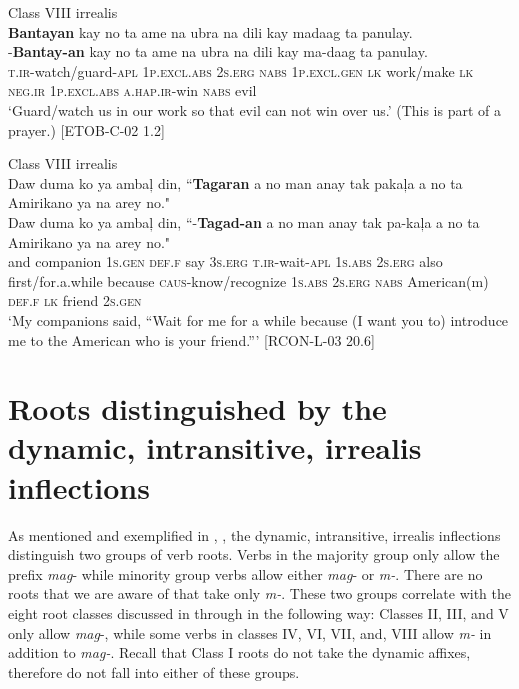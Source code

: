 \newpage
\ea
Class VIII irrealis \\
\textbf{Bantayan}  kay  no  ta  ame  na  ubra na  dili  kay  madaag  ta  panulay. \\\smallskip
\gll \emptyset{}-\textbf{Bantay-an}  kay  no  ta  ame  na  ubra na  dili  kay  ma-daag  ta  panulay. \\
\textsc{t.ir}-watch/guard-\textsc{apl}  1\textsc{p.excl.abs}  2\textsc{s.erg}  \textsc{nabs}  1\textsc{p.excl.gen}  \textsc{lk}  work/make
\textsc{lk}  \textsc{neg.ir}  1\textsc{p.excl.abs}  \textsc{a.hap.ir}-win  \textsc{nabs}  evil \\
\glt ‘Guard/watch us in our work so that evil can not win over us.’ (This is part of a prayer.) [ETOB-C-02 1.2]
\z

\ea
Class VIII irrealis \\
Daw  duma  ko  ya  ambaļ  din,  ``\textbf{Tagaran}  a  no  man anay  tak  pakaļa  a  no  ta Amirikano  ya  na  arey  no."   \\\smallskip
\gll Daw  duma  ko  ya  ambaļ  din,  ``\emptyset{}-\textbf{Tagad-an}  a  no  man anay  tak  pa-kaļa  a  no  ta Amirikano  ya  na  arey  no." \\
and  companion  1\textsc{s.gen}  \textsc{def.f}  say  3\textsc{s.erg}  \textsc{t.ir}-wait-\textsc{apl}  1\textsc{s.abs}  2\textsc{s.erg}  also
first/for.a.while  because  \textsc{caus}-know/recognize  1\textsc{s.abs}  2\textsc{s.erg}  \textsc{nabs}  American(m)  \textsc{def.f}  \textsc{lk}  friend  2\textsc{s.gen} \\
\glt ‘My companions said, “Wait for me for a while because (I want you to) introduce me to the American who is your friend.”' [RCON-L-03 20.6]
\z

\section{Roots distinguished by the dynamic, intransitive, irrealis inflections}
\label{sec:irrealisinflections}

As mentioned and exemplified in , , the dynamic, intransitive, irrealis inflections distinguish two groups of verb roots. Verbs in the majority group only allow the prefix \textit{mag}{}- while minority group verbs allow either \textit{mag}{}- or \textit{m-}.  There are no roots that we are aware of that take only \textit{m-}. These two groups correlate with the eight root classes discussed in  through  in the following way: Classes II, III, and V only allow \textit{mag}{}-, while some verbs in classes IV, VI, VII, and, VIII allow \textit{m-} in addition to \textit{mag-}. Recall that Class I roots do not take the dynamic affixes, therefore do not fall into either of these groups.

